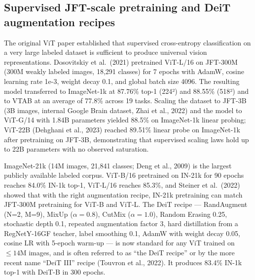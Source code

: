 \subsection{Supervised JFT-scale pretraining and DeiT augmentation recipes}\label{supervised-jft-scale-pretraining-and-deit-augmentation-recipes}

The original ViT paper established that supervised cross-entropy classification on a very large labeled dataset is sufficient to produce universal vision representations. Dosovitskiy et al.~(2021) pretrained ViT-L/16 on JFT-300M (300M weakly labeled images, 18,291 classes) for 7 epochs with AdamW, cosine learning rate 1e-3, weight decay 0.1, and global batch size 4096. The resulting model transferred to ImageNet-1k at 87.76\% top-1 (224²) and 88.55\% (518²) and to VTAB at an average of 77.8\% across 19 tasks. Scaling the dataset to JFT-3B (3B images, internal Google Brain dataset, Zhai et al., 2022) and the model to ViT-G/14 with 1.84B parameters yielded 88.5\% on ImageNet-1k linear probing; ViT-22B (Dehghani et al., 2023) reached 89.51\% linear probe on ImageNet-1k after pretraining on JFT-3B, demonstrating that supervised scaling laws hold up to 22B parameters with no observed saturation.

ImageNet-21k (14M images, 21,841 classes; Deng et al., 2009) is the largest publicly available labeled corpus. ViT-B/16 pretrained on IN-21k for 90 epochs reaches 84.0\% IN-1k top-1, ViT-L/16 reaches 85.3\%, and Steiner et al.~(2022) showed that with the right augmentation recipe, IN-21k pretraining can match JFT-300M pretraining for ViT-B and ViT-L. The DeiT recipe --- RandAugment (N=2, M=9), MixUp (\(\alpha = 0.8\)), CutMix (\(\alpha = 1.0\)), Random Erasing 0.25, stochastic depth 0.1, repeated augmentation factor 3, hard distillation from a RegNetY-16GF teacher, label smoothing 0.1, AdamW with weight decay 0.05, cosine LR with 5-epoch warm-up --- is now standard for any ViT trained on \(\le 14\)M images, and is often referred to as ``the DeiT recipe'' or by the more recent name ``DeiT III'' recipe (Touvron et al., 2022). It produces 83.4\% IN-1k top-1 with DeiT-B in 300 epochs.

